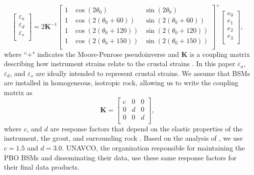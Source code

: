 \documentclass[10pt,a4paper]{article}
\begin{document}
\begin{equation}\label{eq:GaugeToStrain}
\left[\begin{array}{c}
\varepsilon_a \\
\varepsilon_d \\
\varepsilon_s \\
\end{array}\right]
=
2\mathbf{K}^{-1}\left[\begin{array}{ccc}
1 & \cos(2\theta_0) & \sin(2\theta_0) \\
1 & \cos(2(\theta_0 + 60)) & \sin(2(\theta_0 + 60)) \\
1 & \cos(2(\theta_0 + 120)) & \sin(2(\theta_0 + 120)) \\
1 & \cos(2(\theta_0 + 150)) & \sin(2(\theta_0 + 150)) \\
\end{array}\right]^+
\left[\begin{array}{c}
e_0 \\
e_1 \\
e_2 \\
e_3 \\
\end{array}\right],
\end{equation} 
where ``$+$" indicates the Moore-Penrose pseudoinverse and $\mathbf{K}$ is a coupling matrix describing how instrument strains relate to the crustal strains \citep{Hart1996}. In this paper $\varepsilon_a$, $\varepsilon_d$, and $\varepsilon_s$ are ideally intended to represent crustal strains. We assume that BSMs are installed in homogeneous, isotropic rock, allowing us to write the coupling matrix as
\begin{equation}\label{eq:CouplingMatrix}
\mathbf{K} = 
\left[\begin{array}{ccc}
c & 0 & 0 \\
0 & d & 0 \\
0 & 0 & d \\
\end{array}\right],
\end{equation}  
where $c$, and $d$ are response factors that depend on the elastic properties of the instrument, the grout, and surrounding rock \citep{Gladwin1985}. Based on the analysis of \citet{Gladwin1985}, we use $c=1.5$ and $d=3.0$. UNAVCO, the organization responsible for maintaining the PBO BSMs and disseminating their data, use these same response factors for their final data products. 
\end{document}
